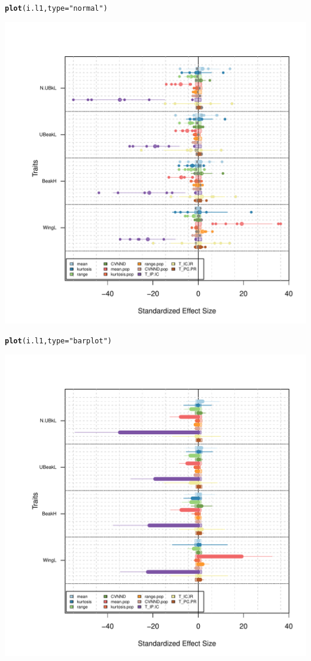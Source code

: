 \documentclass[12pt]{article}\usepackage[]{graphicx}\usepackage[]{color}
\makeatletter
\def\maxwidth{ %
  \ifdim\Gin@nat@width>\linewidth
    \linewidth
  \else
    \Gin@nat@width
  \fi
}
\newcommand{\hlstr}[1]{\textcolor[rgb]{0.192,0.494,0.8}{#1}}%
\newcommand{\hlstd}[1]{\textcolor[rgb]{0.345,0.345,0.345}{#1}}%
\newcommand{\hlkwc}[1]{\textcolor[rgb]{0.333,0.667,0.333}{#1}}%
\newcommand{\hlkwd}[1]{\textcolor[rgb]{0.737,0.353,0.396}{\textbf{#1}}}%
\newenvironment{kframe}{%
 \def\at@end@of@kframe{}%
 \ifinner\ifhmode%
  \def\at@end@of@kframe{\end{minipage}}%
  \begin{minipage}{\columnwidth}%
 \fi\fi%
 \def\FrameCommand##1{\hskip\@totalleftmargin \hskip-\fboxsep
 \colorbox{shadecolor}{##1}\hskip-\fboxsep
     \hskip-\linewidth \hskip-\@totalleftmargin \hskip\columnwidth}%
 \MakeFramed {\advance\hsize-\width
   \@totalleftmargin\z@ \linewidth\hsize
   \@setminipage}}%
 {\par\unskip\endMakeFramed%
 \at@end@of@kframe}
\newenvironment{knitrout}{}{} %
\makeatother
\begin{document}
\begin{knitrout}
\begin{kframe}\begin{alltt}
\hlkwd{plot}\hlstd{(i.l1,}\hlkwc{type} \hlstd{=} \hlstr{"normal"}\hlstd{)}
\end{alltt}
\end{kframe}
\includegraphics[width=\maxwidth]{figure/unnamed-chunk-513} 
\begin{kframe}\begin{alltt}
\hlkwd{plot}\hlstd{(i.l1,}\hlkwc{type} \hlstd{=} \hlstr{"barplot"}\hlstd{)}
\end{alltt}
\end{kframe}
\includegraphics[width=\maxwidth]{figure/unnamed-chunk-514} 


\end{knitrout}
\end{document}
